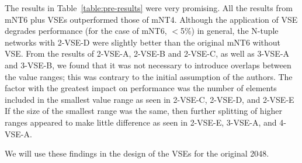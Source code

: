 
The results in Table~\ref{table:pre-results} were very promising.
All the results from \textsf{mNT6} plus VSEs outperformed those of \textsf{mNT4}.
Although the application of VSE degrades performance (for the case of \textsf{mNT6}, $<$5\%) in general, the N-tuple networks with 2-VSE-D were slightly better than the original \textsf{mNT6} without VSE.
From the results of 2-VSE-A, 2-VSE-B and 2-VSE-C, as well as 3-VSE-A and 3-VSE-B, we found that it was not necessary to introduce overlaps between the value ranges; this was contrary to the initial assumption of the authors.
The factor with the greatest impact on performance was the number of elements included in the smallest value range as seen in 2-VSE-C, 2-VSE-D, and 2-VSE-E
If the size of the smallest range was the same, then further splitting of higher ranges appeared to make little difference as seen in 2-VSE-E, 3-VSE-A, and 4-VSE-A.

We will use these findings in the design of the VSEs for the original 2048.

